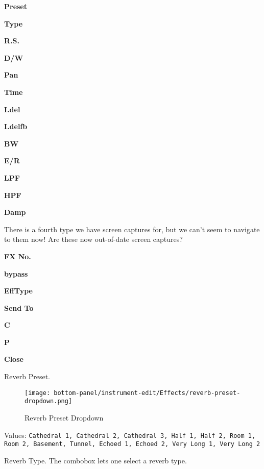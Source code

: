   \begin{enumber}
      \item \textbf{Preset}
      \item \textbf{Type}
      \item \textbf{R.S.}
      \item \textbf{D/W}
      \item \textbf{Pan}
      \item \textbf{Time}
      \item \textbf{I.del}
      \item \textbf{I.delfb}
      \item \textbf{BW}
      \item \textbf{E/R}
      \item \textbf{LPF}
      \item \textbf{HPF}
      \item \textbf{Damp}
   \end{enumber}

  There is a fourth type we have screen captures for, but we can't seem
  to navigate to them now!  Are these now out-of-date screen captures?

   \begin{enumber}
      \item \textbf{FX No.}
      \item \textbf{bypass}
      \item \textbf{EffType}
      \item \textbf{Send To}
      \item \textbf{C}
      \item \textbf{P}
      \item \textbf{Close}
   \end{enumber}

   \setcounter{ItemCounter}{0}      %

      Reverb Preset.

\begin{figure}[H]
   \centering 
   \texttt{[image: bottom-panel/instrument-edit/Effects/reverb-preset-dropdown.png]}
   \caption{Reverb Preset Dropdown}
   \label{fig:reverb_preset_dropdown}
\end{figure}

   Values: \texttt{Cathedral 1, Cathedral 2, Cathedral 3, Half 1, Half 2,
              Room 1, Room 2, Basement, Tunnel, Echoed 1, Echoed 2, Very Long
               1, Very Long 2}

   Reverb Type.
   The combobox lets one select a reverb type.

